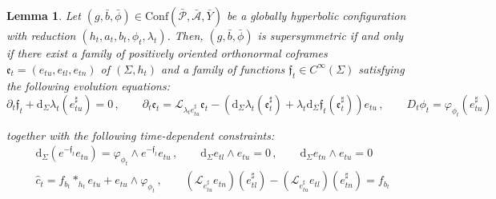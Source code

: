 \documentclass[10pt,reqno,a4paper]{amsart}
\theoremstyle{plain}
\newtheorem{lemma}[thm]{Lemma}
\theoremstyle{definition}
\theoremstyle{remark}
\theoremstyle{remark}
\def\dd{\mathrm{d}}
\def\Conf{\mathrm{Conf}}
\def\cA{\mathcal{A}}
\def\cP{\mathcal{P}}
\def\cL{\mathcal{L}}
\def\cL{\mathcal{L}}
\def\fre{\mathfrak{e}}
\renewcommand{\(}{ (}
\renewcommand{\)}{ )}
\newcommand{\frf}{\mathfrak{f}}
\begin{document}
\begin{lemma}
\label{lemma:susyevolutionNS}
Let $(g,\bar b,\bar\phi) \in \Conf(\bar{\cP},\bar{\cA},\bar{Y})$ be a globally hyperbolic configuration with reduction $( h_t , a_t , b_t , \phi_t,\lambda_t)$. Then, $(g,\bar b,\bar\phi)$ is supersymmetric if and only if there exist a family of positively oriented orthonormal coframes $\fre_t=(e_{tu},e_{tl},e_{tn})$ of $(\Sigma , h_t)$ and a family of functions $\frf_t\in C^\infty(\Sigma)$ satisfying the following evolution equations:
\begin{equation}
 \label{eq:NSNSspecializedevolution}
 \partial_t\frf_t+\dd_\Sigma\lambda_t(e^{\sharp}_{tu}) = 0\, , \qquad \partial_t\fre_t
 =\cL_{\lambda_te^{\sharp}_{tu}}\fre_t
 - (\dd_\Sigma\lambda_t(\fre_t^\sharp)
       +\lambda_t\dd_\Sigma\frf_t(\fre_t^\sharp) )e_{tu}\, , \qquad D_t\phi_t = \varphi_{\phi_t}(e^{\sharp}_{tu})
\end{equation}

\noindent
together with the following time-dependent constraints:
\begin{eqnarray}
 \label{eq:NSNSspecializedconstraints}
 & \dd_\Sigma(e^{-\frf_t}e_{tu}) = \varphi_{\phi_t}\wedge e^{-\frf_t}e_{tu}\, , \qquad   \dd_\Sigma e_{tl}\wedge e_{tu} = 0\, ,
 \qquad \dd_\Sigma e_{tn}\wedge e_{tu}=0 \nonumber \\
& \widehat{c}_t = f_{b_t}\ast_{h_t} e_{tu} + e_{tu}\wedge \varphi_{\phi_t}\, , \qquad (\cL_{e^{\sharp}_{tu}}e_{tn})(e^{\sharp}_{tl}) -(\cL_{e^{\sharp}_{tu}}e_{tl})(e^{\sharp}_{tn}) = f_{b_t}
\end{eqnarray}
\end{lemma}
\end{document}
